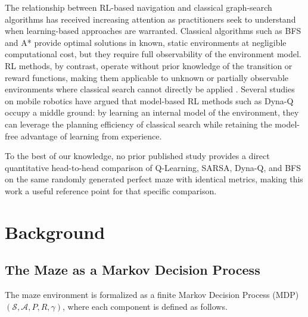 \documentclass[11pt]{article}
\begin{document}
The relationship between RL-based navigation and classical graph-search
algorithms has received increasing attention as practitioners seek to
understand when learning-based approaches are warranted. Classical
algorithms such as BFS and A* provide optimal solutions in known,
static environments at negligible computational cost, but they require
full observability of the environment model. RL methods, by contrast,
operate without prior knowledge of the transition or reward functions,
making them applicable to unknown or partially observable environments
where classical search cannot directly be applied \cite{sutton2018}.
Several studies on mobile robotics \cite{ha2018} have argued that
model-based RL methods such as Dyna-Q occupy a middle ground: by learning
an internal model of the environment, they can leverage the planning
efficiency of classical search while retaining the model-free advantage
of learning from experience.

To the best of our knowledge, no prior published study provides a direct
quantitative head-to-head comparison of Q-Learning, SARSA, Dyna-Q, and
BFS on the same randomly generated perfect maze with identical metrics,
making this work a useful reference point for that specific comparison.

\section{Background}

\subsection{The Maze as a Markov Decision Process}

The maze environment is formalized as a finite Markov Decision Process
(MDP) $(\mathcal{S}, \mathcal{A}, P, R, \gamma)$, where each component
is defined as follows.
\end{document}
